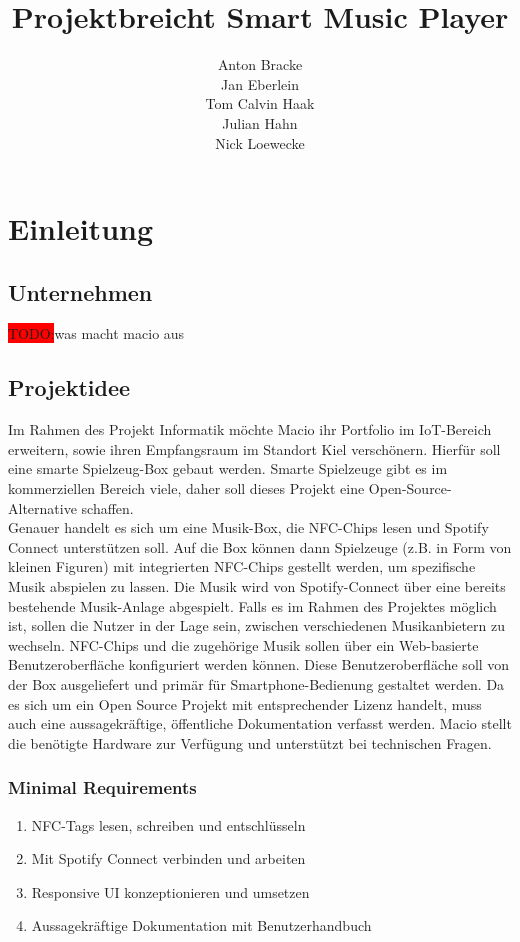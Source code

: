 \documentclass[10pt, a4paper, draft]{article}
\title{Projektbreicht Smart Music Player}
\author{Anton Bracke\\Jan Eberlein\\Tom Calvin Haak\\Julian Hahn\\Nick Loewecke}
\begin{document}
\maketitle
\newpage
\tableofcontents
\newpage

\section{Einleitung}
\subsection{Unternehmen}
\colorbox{red}{TODO:}was macht macio aus
\subsection{Projektidee}
Im Rahmen des Projekt Informatik möchte Macio ihr Portfolio im IoT-Bereich erweitern, sowie ihren Empfangsraum im Standort Kiel verschönern.
Hierfür soll eine smarte Spielzeug-Box gebaut werden.
Smarte Spielzeuge gibt es im kommerziellen Bereich viele, daher soll dieses Projekt eine Open-Source-Alternative schaffen.\\
Genauer handelt es sich um eine Musik-Box, die NFC-Chips lesen und Spotify Connect unterstützen soll.
Auf die Box können dann Spielzeuge (z.B. in Form von kleinen Figuren) mit integrierten NFC-Chips gestellt werden, um spezifische Musik abspielen zu lassen.
Die Musik wird von Spotify-Connect über eine bereits bestehende Musik-Anlage abgespielt.
Falls es im Rahmen des Projektes möglich ist, sollen die Nutzer in der Lage sein, zwischen verschiedenen Musikanbietern zu wechseln.
NFC-Chips und die zugehörige Musik sollen über ein Web-basierte Benutzeroberfläche konfiguriert werden können.
Diese Benutzeroberfläche soll von der Box ausgeliefert und primär für Smartphone-Bedienung gestaltet werden.
Da es sich um ein Open Source Projekt mit entsprechender Lizenz handelt, muss auch eine aussagekräftige, öffentliche Dokumentation verfasst werden.
Macio stellt die benötigte Hardware zur Verfügung und unterstützt bei technischen Fragen.

\subsubsection{Minimal Requirements}
\begin{enumerate}
  \item NFC-Tags lesen, schreiben und entschlüsseln
  \item Mit Spotify Connect verbinden und arbeiten
  \item Responsive UI konzeptionieren und umsetzen
  \item Aussagekräftige Dokumentation mit Benutzerhandbuch
\end{enumerate}
\end{document}
